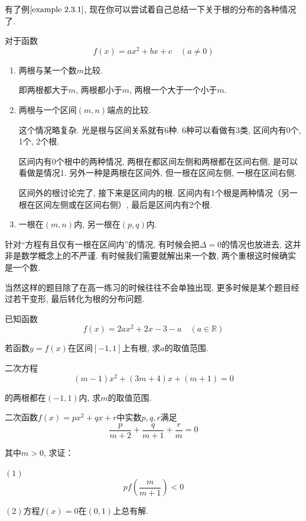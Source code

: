 有了例$\ref*{example 2.3.1}$, 现在你可以尝试着自己总结一下关于根的分布的各种情况了. 

对于函数\[f(x)=ax^2+bx+c\quad(a\neq0)\]
\begin{enumerate}
    \item 两根与某一个数$m$比较. 
    
    即两根都大于$m$, 两根都小于$m$, 两根一个大于一个小于$m$. 

    \item 两根与一个区间$(m,n)$端点的比较. 
    
    这个情况略复杂. 光是根与区间关系就有6种. 6种可以看做有3类, 区间内有0个, 1个, 2个根. 

    区间内有0个根中的两种情况, 两根在都区间左侧和两根都在区间右侧, 是可以看做是情况1. 
    另外一种是两根在区间外, 但一根在区间左侧, 一根在区间右侧. 

    区间外的根讨论完了, 接下来是区间内的根. 
    区间内有1个根是两种情况（另一根在区间左侧或在区间右侧）, 最后是区间内有2个根. 
    \item 一根在$(m,n)$内, 另一根在$(p,q)$内. 
\end{enumerate}

\begin{zhu}
    针对“方程有且仅有一根在区间内”的情况, 有时候会把$\Delta=0$的情况也放进去, 
    这并非是数学概念上的不严谨. 有时候我们需要就解出来一个数, 两个重根这时候确实是一个数. 
\end{zhu}

当然这样的题目除了在高一练习的时候往往不会单独出现, 更多时候是某个题目经过若干变形, 最后转化为根的分布问题. 
\begin{exercise}
    已知函数\[f(x)=2ax^2+2x-3-a\quad(a\in \mathbb{R} )\]

    若函数$y=f(x)$在区间$[-1,1]$上有根, 求$a$的取值范围. 
\end{exercise}
\begin{exercise}
    二次方程\[(m-1)x^2+(3m+4)x+(m+1)=0 \]

    的两根都在$(-1,1)$内, 求$m$的取值范围. 
\end{exercise}
\begin{exercise}
    二次函数$f(x)=px^2+qx+r$中实数$p,q,r$满足
    \[\frac{p}{m+2}+\frac{q}{m+1}+\frac{r}{m}=0\]

    其中$m>0$, 求证：

    $(1)$\[pf(\frac{m}{m+1})<0\]

    $(2)$方程$f(x)=0$在$(0,1)$上总有解. 
\end{exercise}










